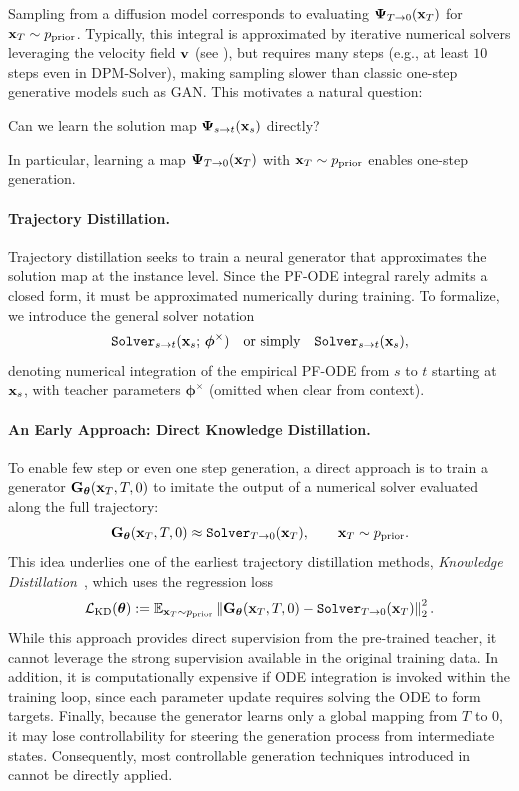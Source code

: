 Sampling from a diffusion model corresponds to evaluating ${\bm{\Psi}}_{T\to 0}({\mathbf{x}}_T)$ for ${\mathbf{x}}_T \sim p_{\mathrm{prior}}$. Typically, this integral is approximated by iterative numerical solvers leveraging the velocity field ${\mathbf{v}}$ (see ), but requires many steps (e.g., at least $10$ steps even in DPM-Solver), making sampling slower than classic one-step generative models such as GAN. This motivates a natural question:
\begin{question}
    Can we learn the solution map ${\bm{\Psi}}_{s\to t}({\mathbf{x}}_s)$ directly? 
\end{question}
In particular, learning a map ${\bm{\Psi}}_{T\to 0}({\mathbf{x}}_T)$ with ${\mathbf{x}}_T \sim p_{\mathrm{prior}}$ enables one-step generation.


\paragraph{Trajectory Distillation.}

Trajectory distillation seeks to train a neural generator that approximates the solution map at the instance level. Since the PF-ODE integral rarely admits a closed form, it must be approximated numerically during training. To formalize, we introduce the general solver notation
\begin{align}\label{eq:solver}
    \mathtt{Solver}_{s\to t}({\mathbf{x}}_s;\,\bm{\phi}^\times)
    \quad \text{or simply} \quad
    \mathtt{Solver}_{s\to t}({\mathbf{x}}_s),
\end{align}
denoting numerical integration of the empirical PF-ODE from $s$ to $t$ starting
at ${\mathbf{x}}_s$, with teacher parameters $\bm{\phi}^\times$ (omitted when clear from
context). 



\paragraph{An Early Approach: Direct Knowledge Distillation.}
To enable few step or even one step generation, a direct approach is to train a generator ${\mathbf{G}}_{\bm{\theta}}({\mathbf{x}}_T, T,0)$ to imitate the output of a numerical solver evaluated along the full trajectory:
\[
{\mathbf{G}}_{\bm{\theta}}({\mathbf{x}}_T, T,0)\approx \mathtt{Solver}_{T\to 0}({\mathbf{x}}_T), 
\qquad {\mathbf{x}}_T \sim p_{\mathrm{prior}}.
\]
This idea underlies one of the earliest trajectory distillation methods, \emph{Knowledge Distillation}~\citep{luhman2021knowledge}, which uses the regression loss
\[
\mathcal{L}_{\mathrm{KD}}({\bm{\theta}})
:= 
\mathbb{E}_{{\mathbf{x}}_T \sim p_{\mathrm{prior}}}
\left\|
{\mathbf{G}}_{\bm{\theta}}({\mathbf{x}}_T, T,0)
-
\mathtt{Solver}_{T\to 0}({\mathbf{x}}_T)
\right\|_2^2.
\]
While this approach provides direct supervision from the pre-trained teacher,
it cannot leverage the strong supervision available in the original training data.
In addition, it is computationally expensive if ODE integration is invoked within
the training loop, since each parameter update requires solving the ODE to form
targets. Finally, because the generator learns only a global mapping from $T$ to $0$, it may lose controllability for steering the generation process from intermediate states. Consequently, most controllable generation techniques introduced in  cannot be directly applied.




